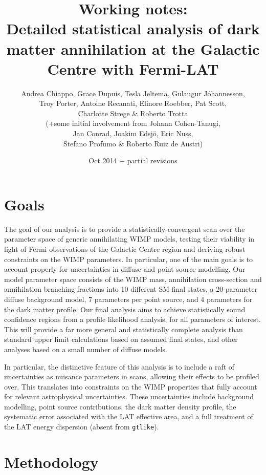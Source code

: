 \documentclass{article}
\author{Andrea Chiappo, Grace Dupuis, Tesla Jeltema, Gu{\dh}laugur J\'ohannesson, \\Troy Porter, Antoine Recanati, Elinore Roebber, Pat Scott, \\Charlotte Strege \& Roberto Trotta\\ (+some initial involvement from Johann Cohen-Tanugi, \\Jan Conrad, Joakim Edsj\"o, Eric Nuss, \\Stefano Profumo \& Roberto Ruiz de Austri)}
\date{Oct 2014 + partial revisions}
\title{\textbf{Working notes:}\\Detailed statistical analysis of dark matter annihilation at the Galactic Centre with Fermi-LAT}
\begin{document}
\VerbatimFootnotes
\maketitle

\section{Goals}

The goal of our analysis is to provide a statistically-convergent scan over the parameter space of generic annihilating WIMP models, testing their viability in light of Fermi observations of the Galactic Centre region and deriving robust constraints on the WIMP parameters.  In particular, one of the main goals is to account properly for uncertainties in diffuse and point source modelling.  Our model parameter space consists of the WIMP mass, annihilation cross-section and annihilation branching fractions into 10 different SM final states, a 20-parameter diffuse background model, 7 parameters per point source, and 4 parameters for the dark matter profile.  Our final analysis aims to achieve statistically sound confidence regions from a profile likelihood analysis, for all parameters of interest.  This will provide a far more general and statistically complete analysis than standard upper limit calculations based on assumed final states, and other analyses based on a small number of diffuse models.

In particular, the distinctive feature of this analysis is to include a raft of uncertainties as nuisance parameters in scans, allowing their effects to be profiled over. This translates into constraints on the WIMP properties that fully account for relevant astrophysical uncertainties.  These uncertainties include background modelling, point source contributions, the dark matter density profile, the systematic error associated with the LAT effective area, and a full treatment of the LAT energy dispersion (absent from \texttt{gtlike}).

\section{Methodology}
\end{document}
